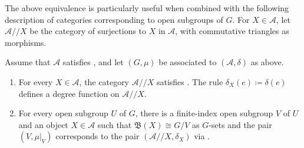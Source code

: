 \documentclass[11pt]{amsart}
\newcommand\Cref[1]{\zcref[S]{#1}}
\theoremstyle{definition}
\theoremstyle{remark}
\newcommand\cA{\mathcal A}
\newcommand\fB{\mathfrak B}
\renewcommand\:\colon
\renewcommand\:\colon
\begin{document}
The above equivalence is particularly useful when combined with the following description of categories corresponding to open subgroups of $G$. For $X\in\cA$, let $\cA//X$ be the category of surjections to $X$ in $\cA$, with commutative triangles as morphisms.

\begin{proposition} \label{p:subgroup-of-G}
    Assume that $\cA$ satisfies \Regg, and let $(G,\mu)$ be associated to $(\cA,\delta)$ as above.
    \begin{enumerate}
        \item[(a)] For every $X\in\cA$, the category $\cA//X$ satisfies \Regg. The rule $\delta_X(e)\coloneqq\delta(e)$ defines a degree function on $\cA//X$.
        \item[(b)] For every open subgroup $U$ of $G$, there is a finite-index open subgroup $V$ of $U$ and an object $X\in\cA$ such that $\fB(X)\cong G/V$ as $G$-sets and the pair $(V,\mu|_V)$ corresponds to the pair $(\cA//X,\delta_X)$ via \Cref{c:g,c:mu}.
    \end{enumerate}
\end{proposition}
\end{document}

